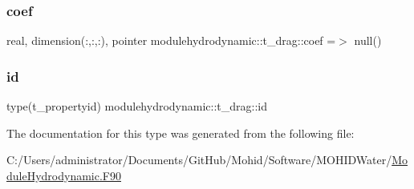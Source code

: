 \subsubsection{\texorpdfstring{coef}{coef}}
{\footnotesize\ttfamily real, dimension(\+:,\+:,\+:), pointer modulehydrodynamic\+::t\+\_\+drag\+::coef =$>$ null()\hspace{0.3cm}{\ttfamily [private]}}

\mbox{\label{structmodulehydrodynamic_1_1t__drag_ad5cdf23537bb01c8992ab72008e2fe4d}} 
\subsubsection{\texorpdfstring{id}{id}}
{\footnotesize\ttfamily type(t\+\_\+propertyid) modulehydrodynamic\+::t\+\_\+drag\+::id\hspace{0.3cm}{\ttfamily [private]}}



The documentation for this type was generated from the following file\+:\begin{DoxyCompactItemize}
\item 
C\+:/\+Users/administrator/\+Documents/\+Git\+Hub/\+Mohid/\+Software/\+M\+O\+H\+I\+D\+Water/\mbox{\hyperlink{_module_hydrodynamic_8_f90}{Module\+Hydrodynamic.\+F90}}\end{DoxyCompactItemize}

